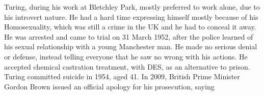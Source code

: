 \documentclass[12pt, a4paper, notitlepage, oneside]{article}
\begin{document}
Turing, during his work at Bletchley Park, mostly preferred to work alone, due to his introvert nature. He had a hard time expressing himself mostly because of his Homosexuality, which was still a crime in the UK and he had to conceal it away. He was arrested and came to trial on 31 March 1952, after the police learned of his sexual relationship with a young Manchester man. He made no serious denial or defense, instead telling everyone that he saw no wrong with his actions. He accepted chemical castration treatment, with DES, as an alternative to prison. Turing committed suicide in 1954, aged 41. In 2009, British Prime Minister Gordon Brown issued an official apology for his prosecution, saying 
\end{document}
